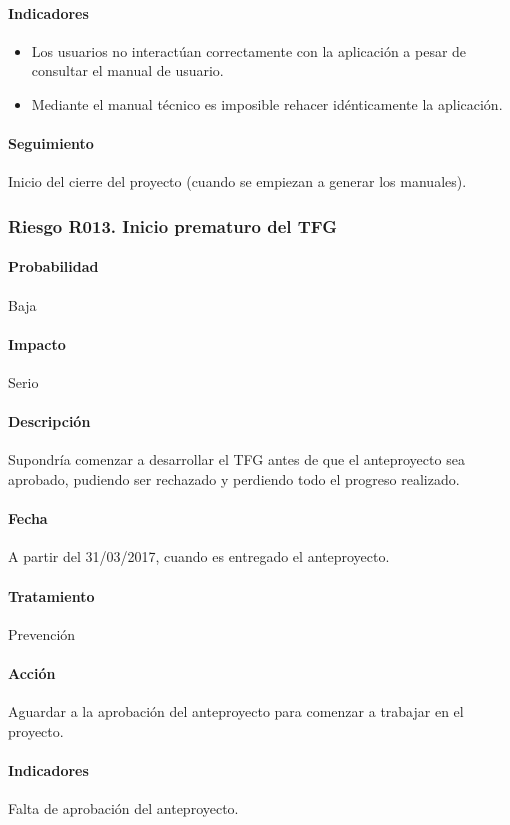 \documentclass[10pt,a4paper]{article}
\begin{document}
				\paragraph{Indicadores} 
				\begin{itemize}
				    \item Los usuarios no interactúan correctamente con la aplicación a pesar de consultar el manual de usuario.
				    \item Mediante el manual técnico es imposible rehacer idénticamente la aplicación.
				\end{itemize}				 
				\paragraph{Seguimiento}	Inicio del cierre del proyecto (cuando se empiezan a generar los manuales).
				
			\subsubsection{Riesgo R013. Inicio prematuro del TFG}
				\paragraph{Probabilidad} Baja
				\paragraph{Impacto}	Serio
				\paragraph{Descripción} Supondría comenzar a desarrollar el TFG antes de que el anteproyecto sea aprobado, pudiendo ser rechazado y perdiendo todo el progreso realizado.
				\paragraph{Fecha} A partir del 31/03/2017, cuando es entregado el anteproyecto.
				\paragraph{Tratamiento} Prevención
				\paragraph{Acción} Aguardar a la aprobación del anteproyecto para comenzar a trabajar en el proyecto.
				\paragraph{Indicadores} Falta de aprobación del anteproyecto.
\end{document}
